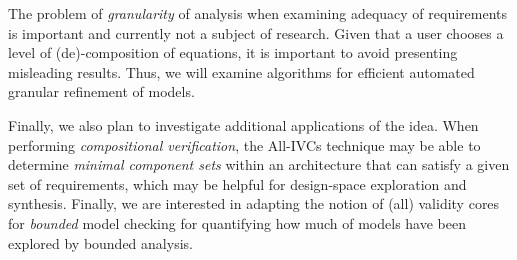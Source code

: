 The problem of {\em granularity} of analysis when examining adequacy of requirements is important and currently not a subject of research.  Given that a user chooses a level of (de)-composition of equations, it is important to avoid presenting misleading results.  Thus, we will examine algorithms for efficient automated granular refinement of models.

Finally, we also plan to investigate additional applications of the idea.  When performing {\em compositional verification}, the All-IVCs technique may be able to determine {\em minimal component sets} within an architecture that can satisfy a given set of requirements, which may be helpful for design-space exploration and synthesis. Finally, we are interested in adapting the notion of (all) validity cores for \emph{bounded} model checking for quantifying how much of models have been explored by bounded analysis. 